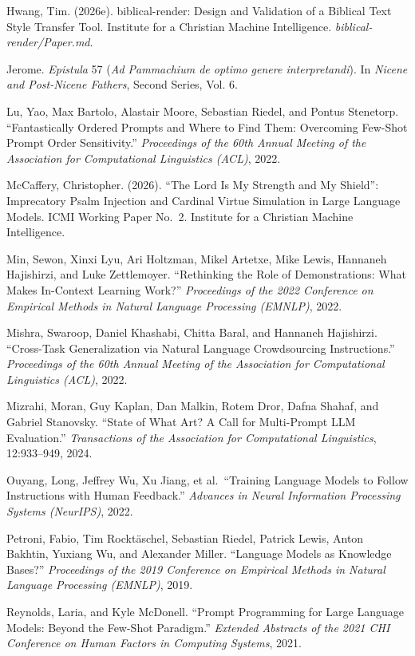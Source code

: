 \documentclass[10pt, letterpaper, twocolumn]{article}
\begin{document}
Hwang, Tim. (2026e). biblical-render: Design and Validation of a Biblical Text Style Transfer Tool. Institute for a Christian Machine Intelligence. \emph{biblical-render/Paper.md}.

Jerome. \emph{Epistula} 57 (\emph{Ad Pammachium de optimo genere interpretandi}). In \emph{Nicene and Post-Nicene Fathers}, Second Series, Vol. 6.

Lu, Yao, Max Bartolo, Alastair Moore, Sebastian Riedel, and Pontus Stenetorp. ``Fantastically Ordered Prompts and Where to Find Them: Overcoming Few-Shot Prompt Order Sensitivity.'' \emph{Proceedings of the 60th Annual Meeting of the Association for Computational Linguistics (ACL)}, 2022.

McCaffery, Christopher. (2026). ``The Lord Is My Strength and My Shield'': Imprecatory Psalm Injection and Cardinal Virtue Simulation in Large Language Models. ICMI Working Paper No.~2. Institute for a Christian Machine Intelligence.

Min, Sewon, Xinxi Lyu, Ari Holtzman, Mikel Artetxe, Mike Lewis, Hannaneh Hajishirzi, and Luke Zettlemoyer. ``Rethinking the Role of Demonstrations: What Makes In-Context Learning Work?'' \emph{Proceedings of the 2022 Conference on Empirical Methods in Natural Language Processing (EMNLP)}, 2022.

Mishra, Swaroop, Daniel Khashabi, Chitta Baral, and Hannaneh Hajishirzi. ``Cross-Task Generalization via Natural Language Crowdsourcing Instructions.'' \emph{Proceedings of the 60th Annual Meeting of the Association for Computational Linguistics (ACL)}, 2022.

Mizrahi, Moran, Guy Kaplan, Dan Malkin, Rotem Dror, Dafna Shahaf, and Gabriel Stanovsky. ``State of What Art? A Call for Multi-Prompt LLM Evaluation.'' \emph{Transactions of the Association for Computational Linguistics}, 12:933--949, 2024.

Ouyang, Long, Jeffrey Wu, Xu Jiang, et al.~``Training Language Models to Follow Instructions with Human Feedback.'' \emph{Advances in Neural Information Processing Systems (NeurIPS)}, 2022.

Petroni, Fabio, Tim Rocktäschel, Sebastian Riedel, Patrick Lewis, Anton Bakhtin, Yuxiang Wu, and Alexander Miller. ``Language Models as Knowledge Bases?'' \emph{Proceedings of the 2019 Conference on Empirical Methods in Natural Language Processing (EMNLP)}, 2019.

Reynolds, Laria, and Kyle McDonell. ``Prompt Programming for Large Language Models: Beyond the Few-Shot Paradigm.'' \emph{Extended Abstracts of the 2021 CHI Conference on Human Factors in Computing Systems}, 2021.
\end{document}
